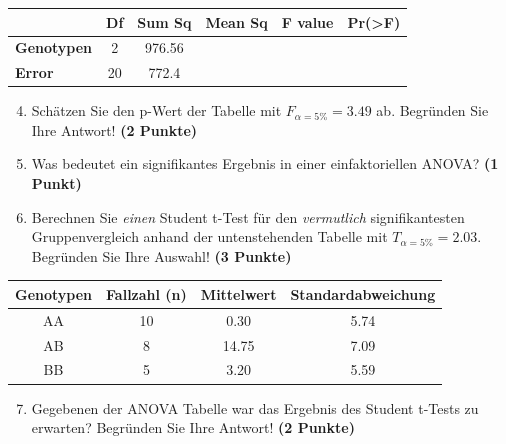 \documentclass[a4paper, 9pt]{scrartcl}\usepackage[]{graphicx}\usepackage[]{xcolor}
\newenvironment{knitrout}{}{} %
\begin{document}
\vspace{1Ex}

\begin{center}
  \Large
  \begin{tabular}{lccccp{3cm}}
\toprule
     & \textbf{Df} & \textbf{Sum Sq} & \textbf{Mean Sq} & \textbf{F value} & \textbf{Pr(>F)} \strut\\
    \midrule
   \textbf{Genotypen}  & 2 & 976.56 &  &  &  \strut\\
   \textbf{Error}  & 20 & 772.4 &  &  &  \strut\\
\bottomrule
  \end{tabular}
\end{center}

\vspace{1Ex}

\begin{enumerate}
  \setcounter{enumi}{3}
\item Schätzen Sie den p-Wert der Tabelle mit $F_{\alpha = 5\%} = 3.49$ ab. Begründen Sie Ihre Antwort! \textbf{(2 Punkte)}
\item Was bedeutet ein signifikantes Ergebnis in einer einfaktoriellen ANOVA? \textbf{(1 Punkt)}
\item Berechnen Sie \textit{einen} Student t-Test für den \textit{vermutlich} signifikantesten Gruppenvergleich anhand der untenstehenden Tabelle mit $T_{\alpha = 5\%} = 2.03$. Begründen Sie Ihre Auswahl! \textbf{(3 Punkte)}
\end{enumerate}


\begin{knitrout}
\color{fgcolor}\begin{table}[!h]
\centering\begingroup\fontsize{11}{13}\selectfont

\begin{tabular}{cccc}
\toprule
\textbf{Genotypen} & \textbf{Fallzahl (n)} & \textbf{Mittelwert} & \textbf{Standardabweichung}\\
\midrule
AA & 10 & 0.30 & 5.74\\
AB & 8 & 14.75 & 7.09\\
BB & 5 & 3.20 & 5.59\\
\bottomrule
\end{tabular}
\endgroup{}
\end{table}

\end{knitrout}


\begin{enumerate}
  \setcounter{enumi}{6}
\item Gegebenen der ANOVA Tabelle war das Ergebnis des Student t-Tests zu erwarten? Begründen Sie Ihre Antwort! \textbf{(2 Punkte)}
\end{enumerate}
\end{document}

